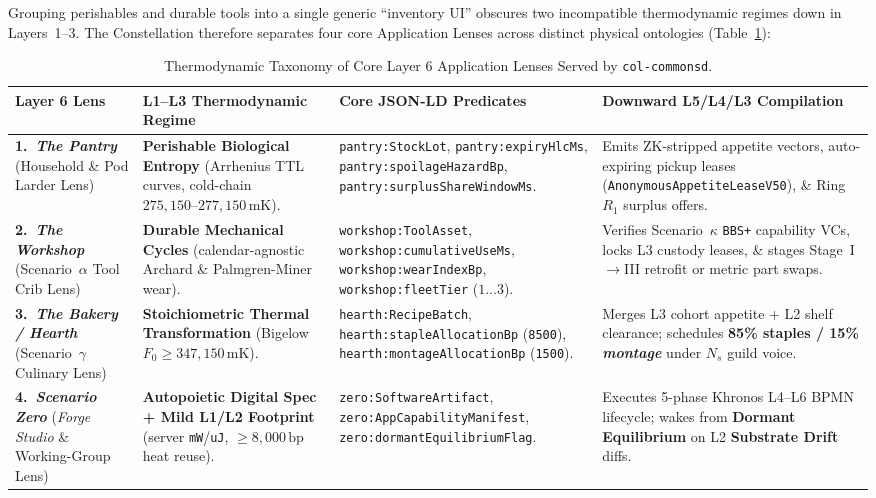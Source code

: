 Grouping perishables and durable tools into a single generic ``inventory UI'' obscures two incompatible thermodynamic regimes down in Layers~1--3. The Constellation therefore separates four core Application Lenses across distinct physical ontologies (Table~\ref{tab:l6-lens-taxonomy}):

\begin{table}[htbp]
\centering
\small
\setlength{\tabcolsep}{3.5pt}
\begin{tabular}{|p{}|p{}|p{}|p{}|}
\hline
\textbf{Layer 6 Lens} & \textbf{L1--L3 Thermodynamic Regime} & \textbf{Core JSON-LD Predicates} & \textbf{Downward L5/L4/L3 Compilation} \\
\hline
\textbf{1.\ \textit{The Pantry}} (Household \& Pod Larder Lens) & \textbf{Perishable Biological Entropy} (Arrhenius TTL curves, cold-chain $275{,}150\text{--}277{,}150\,\mathrm{mK}$). & \texttt{pantry:StockLot}, \texttt{pantry:expiryHlcMs}, \texttt{pantry:spoilageHazardBp}, \texttt{pantry:surplusShareWindowMs}. & Emits ZK-stripped appetite vectors, auto-expiring pickup leases (\texttt{AnonymousAppetiteLeaseV50}), \& Ring~$R_1$ surplus offers. \\
\hline
\textbf{2.\ \textit{The Workshop}} (Scenario~$\alpha$ Tool Crib Lens) & \textbf{Durable Mechanical Cycles} (calendar-agnostic Archard \& Palmgren-Miner wear). & \texttt{workshop:ToolAsset}, \texttt{workshop:cumulativeUseMs}, \texttt{workshop:wearIndexBp}, \texttt{workshop:fleetTier} ($1\dots 3$). & Verifies Scenario~$\kappa$ \texttt{BBS+} capability VCs, locks L3 custody leases, \& stages Stage~I$\to$III retrofit or metric part swaps. \\
\hline
\textbf{3.\ \textit{The Bakery / Hearth}} (Scenario~$\gamma$ Culinary Lens) & \textbf{Stoichiometric Thermal Transformation} (Bigelow $F_0 \ge 347{,}150\,\mathrm{mK}$). & \texttt{hearth:RecipeBatch}, \texttt{hearth:stapleAllocationBp} (\texttt{8500}), \texttt{hearth:montageAllocationBp} (\texttt{1500}). & Merges L3 cohort appetite + L2 shelf clearance; schedules \textbf{85\% staples / 15\% \textit{montage}} under $N_s$ guild voice. \\
\hline
\textbf{4.\ \textit{Scenario Zero}} (\textit{Forge Studio} \& Working-Group Lens) & \textbf{Autopoietic Digital Spec + Mild L1/L2 Footprint} (server \texttt{mW}/\texttt{uJ}, $\ge 8{,}000\,\mathrm{bp}$ heat reuse). & \texttt{zero:SoftwareArtifact}, \texttt{zero:AppCapabilityManifest}, \texttt{zero:dormantEquilibriumFlag}. & Executes 5-phase Khronos L4--L6 BPMN lifecycle; wakes from \textbf{Dormant Equilibrium} on L2 \textbf{Substrate Drift} diffs. \\
\hline
\end{tabular}
\caption{Thermodynamic Taxonomy of Core Layer 6 Application Lenses Served by \texttt{col-commonsd}.}
\label{tab:l6-lens-taxonomy}
\end{table}

